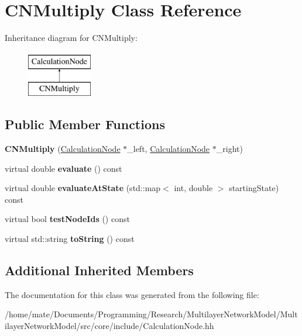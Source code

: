 \hypertarget{classCNMultiply}{}\section{C\+N\+Multiply Class Reference}
\label{classCNMultiply}
Inheritance diagram for C\+N\+Multiply\+:\begin{figure}[H]
\begin{center}
\leavevmode
\includegraphics[height=2.000000cm]{classCNMultiply}
\end{center}
\end{figure}
\subsection*{Public Member Functions}
\begin{DoxyCompactItemize}
\item 
{\bfseries C\+N\+Multiply} (\hyperlink{classCalculationNode}{Calculation\+Node} $\ast$\+\_\+left, \hyperlink{classCalculationNode}{Calculation\+Node} $\ast$\+\_\+right)\hypertarget{classCNMultiply_a440c0e25b1fb642c95757a9118634874}{}\label{classCNMultiply_a440c0e25b1fb642c95757a9118634874}

\item 
virtual double {\bfseries evaluate} () const \hypertarget{classCNMultiply_a51ce205165bfa5842002721332c14f5c}{}\label{classCNMultiply_a51ce205165bfa5842002721332c14f5c}

\item 
virtual double {\bfseries evaluate\+At\+State} (std\+::map$<$ int, double $>$ starting\+State) const \hypertarget{classCNMultiply_a8daa0d3ea8f08db43b6e168f6ca9527b}{}\label{classCNMultiply_a8daa0d3ea8f08db43b6e168f6ca9527b}

\item 
virtual bool {\bfseries test\+Node\+Ids} () const \hypertarget{classCNMultiply_a9ffc252a3cc6ccdb3ef9ee4700f0ac18}{}\label{classCNMultiply_a9ffc252a3cc6ccdb3ef9ee4700f0ac18}

\item 
virtual std\+::string {\bfseries to\+String} () const \hypertarget{classCNMultiply_a55edebadef3ea3df839dd8779f1e2e13}{}\label{classCNMultiply_a55edebadef3ea3df839dd8779f1e2e13}

\end{DoxyCompactItemize}
\subsection*{Additional Inherited Members}


The documentation for this class was generated from the following file\+:\begin{DoxyCompactItemize}
\item 
/home/mate/\+Documents/\+Programming/\+Research/\+Multilayer\+Network\+Model/\+Multilayer\+Network\+Model/src/core/include/Calculation\+Node.\+hh\end{DoxyCompactItemize}
